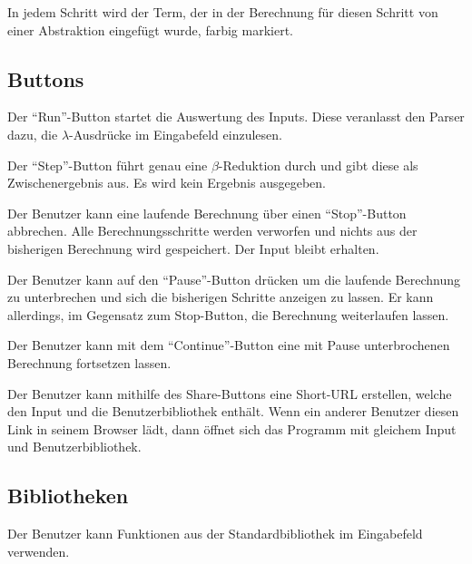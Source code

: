 \documentclass[parskip=full,11pt,twoside]{scrartcl}
\begin{document}
In jedem Schritt wird der Term, der in der Berechnung für diesen Schritt von einer Abstraktion eingefügt wurde, farbig markiert.


\subsection{Buttons}

Der \enquote{Run}-Button startet die Auswertung des Inputs. Diese veranlasst den Parser dazu, die $\lambda$-Ausdrücke im Eingabefeld einzulesen.

Der \enquote {Step}-Button führt genau eine $\beta$-Reduktion durch und gibt diese als Zwischenergebnis aus. Es wird kein Ergebnis ausgegeben.

Der Benutzer kann eine laufende Berechnung über einen \enquote{Stop}-Button abbrechen. Alle Berechnungsschritte werden verworfen und nichts aus der bisherigen Berechnung wird gespeichert. Der Input bleibt erhalten.

Der Benutzer kann auf den \enquote{Pause}-Button drücken um die laufende Berechnung zu unterbrechen und sich die bisherigen Schritte anzeigen zu lassen. Er kann allerdings, im Gegensatz zum Stop-Button, die Berechnung weiterlaufen lassen.

Der Benutzer kann mit dem \enquote{Continue}-Button eine mit Pause unterbrochenen Berechnung fortsetzen lassen.

Der Benutzer kann mithilfe des Share-Buttons eine Short-URL erstellen, welche den Input und die Benutzerbibliothek enthält. Wenn ein anderer Benutzer diesen Link in seinem Browser lädt, dann öffnet sich das Programm mit gleichem Input und Benutzerbibliothek.



\subsection{Bibliotheken}

Der Benutzer kann Funktionen aus der Standardbibliothek im Eingabefeld verwenden.
\end{document}
